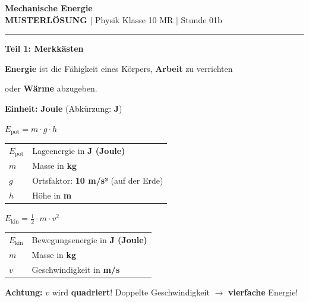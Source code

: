 \documentclass[11pt, a4paper]{article}
\newcommand{\fach}{Physik}
\newcommand{\thema}{Mechanische Energie}
\newcommand{\klasse}{10 MR}
\newcommand{\stunde}{01b}
\newcommand{\lsg}[1]{\textcolor{loesung}{\textbf{#1}}}
\begin{document}

\begin{center}
    {\Large\bfseries\textcolor{fachfarbe}{\thema}}\\[0.2em]
    {\small \textcolor{loesung}{\textbf{MUSTERLÖSUNG}} | \fach{} Klasse \klasse{} | Stunde \stunde}
\end{center}
\vspace{-0.3em}
\hrule
\vspace{0.6em}


\textbf{\large Teil 1: Merkkästen}

\begin{merkkasten}[title={\textbf{Kasten 1: Was ist Energie?}}]
\textbf{Energie} ist die Fähigkeit eines Körpers, \lsg{Arbeit} zu verrichten

oder \lsg{Wärme} abzugeben.

\vspace{6pt}
\textbf{Einheit:} \lsg{Joule} (Abkürzung: \lsg{J})
\end{merkkasten}

\begin{merkkasten}[title={\textbf{Kasten 2: Lageenergie (potenzielle Energie)}}]
\begin{formelkasten}
\centering
\Large $E_\text{pot} = m \cdot g \cdot h$
\end{formelkasten}

\vspace{4pt}
\begin{tabular}{@{}ll@{}}
$E_\text{pot}$ & Lageenergie in \lsg{J (Joule)} \\[4pt]
$m$ & Masse in \lsg{kg} \\[4pt]
$g$ & Ortsfaktor: \textbf{\lsg{10} m/s²} (auf der Erde) \\[4pt]
$h$ & Höhe in \lsg{m}
\end{tabular}
\end{merkkasten}

\begin{merkkasten}[title={\textbf{Kasten 3: Bewegungsenergie (kinetische Energie)}}]
\begin{formelkasten}
\centering
\Large $E_\text{kin} = \frac{1}{2} \cdot m \cdot v^2$
\end{formelkasten}

\vspace{4pt}
\begin{tabular}{@{}ll@{}}
$E_\text{kin}$ & Bewegungsenergie in \lsg{J (Joule)} \\[4pt]
$m$ & Masse in \lsg{kg} \\[4pt]
$v$ & Geschwindigkeit in \lsg{m/s}
\end{tabular}

\vspace{4pt}
\textbf{Achtung:} $v$ wird \lsg{quadriert}! Doppelte Geschwindigkeit $\rightarrow$ \lsg{vierfache} Energie!
\end{merkkasten}
\end{document}
